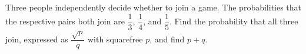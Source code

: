Three people independently decide whether to join a game. The probabilities that the respective pairs both join are $\dfrac{1}{3}$, $\dfrac{1}{4}$, and $\dfrac{1}{5}$. Find the probability that all three join, expressed as $\dfrac{\sqrt p}{q}$ with squarefree $p$, and find $p+q$.

